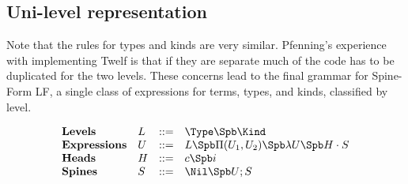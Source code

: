 

\subsection{Uni-level representation}

Note that the rules for types and kinds are very similar.
Pfenning's experience with implementing Twelf is that if they
are separate much of the code has to be duplicated for
the two levels.  These concerns lead to the final 
grammar for Spine-Form LF, a single class of expressions for
terms, types, and kinds, classified by level.

$$
\begin{array}{llll}
\mathbf{Levels} & L & ::= & \Type \Spb \Kind \\
\mathbf{Expressions} & U & ::= & L \Spb \Pi(U_1,U_2) \Spb \lambda U \Spb H\cdot S \\
\mathbf{Heads} & H & ::= & c \Spb i\\
\mathbf{Spines} & S & ::= & \Nil \Spb U;S\\
\end{array} 
$$

